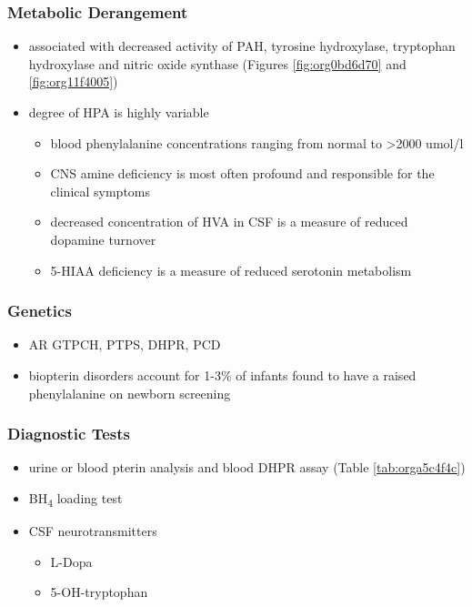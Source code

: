 \documentclass[12pt]{scrartcl}
\begin{document}
\subsubsection{Metabolic Derangement}
\label{sec:org0c06337}
\begin{itemize}
\item associated with decreased activity of PAH, tyrosine hydroxylase,
tryptophan hydroxylase and nitric oxide synthase (Figures \ref{fig:org0bd6d70}
and \ref{fig:org11f4005})
\item degree of HPA is highly variable
\begin{itemize}
\item blood phenylalanine concentrations ranging from normal to \textgreater{}2000
umol/l
\item CNS amine deficiency is most often profound and responsible for
the clinical symptoms
\item decreased concentration of HVA in CSF is a measure of reduced
dopamine turnover
\item 5-HIAA deficiency is a measure of reduced serotonin metabolism
\end{itemize}
\end{itemize}

\subsubsection{Genetics}
\label{sec:orgc58e8bc}
\begin{itemize}
\item AR GTPCH, PTPS, DHPR, PCD
\item biopterin disorders account for 1-3\% of infants found to have a
raised phenylalanine on newborn screening
\end{itemize}

\subsubsection{Diagnostic Tests}
\label{sec:org1465e12}
\begin{itemize}
\item urine or blood pterin analysis and blood DHPR assay (Table \ref{tab:orga5c4f4c})
\item BH\textsubscript{4} loading test
\item CSF neurotransmitters
\begin{itemize}
\item L-Dopa
\item 5-OH-tryptophan
\end{itemize}
\end{itemize}
\end{document}
